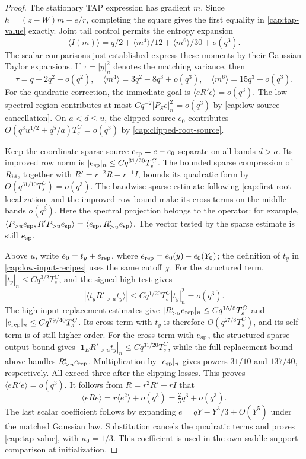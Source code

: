 \begin{proof}
The stationary TAP expression has gradient $m$. Since $h=(z-W)m-e/r$,
completing the square gives the first equality in \eqref{cap:tap-value}
exactly. Joint tail control permits the entropy expansion
\[
 \langle I(m)\rangle
 =q/2+\langle m^4\rangle/12+\langle m^6\rangle/30+o(q^3).
\]
The scalar comparisons just established express these moments by their
Gaussian Taylor expansions.  If $\tau=|y|_n^2$ denotes the matching
variance, then
\[
 \tau=q+2q^2+o(q^2),\quad
 \langle m^4\rangle=3q^2-8q^3+o(q^3),\quad
 \langle m^6\rangle=15q^3+o(q^3).
\]
For the quadratic correction, the immediate goal is
\(\langle eR'e\rangle=o(q^3)\). The low spectral region contributes at
most \(Cq^{-2}|P_Se|_n^2=o(q^3)\) by
\eqref{cap:low-source-cancellation}. On \(a<d\le u\), the clipped source
\(e_0\) contributes \(O(q^3u^{1/2}+q^5/a)T_s^C=o(q^3)\) by
\eqref{cap:clipped-root-source}.

Keep the coordinate-sparse source \(e_{\rm sp}=e-e_0\) separate on all
bands \(d>a\). Its improved row norm is
\(|e_{\rm sp}|_n\le Cq^{31/20}T_s^C\). The bounded sparse compression of
\(R_{\rm hi}\), together with \(R'=r^{-2}R-r^{-1}I\), bounds its
quadratic form by \(O(q^{31/10}T_s^C)=o(q^3)\). The bandwise sparse estimate
following \eqref{cap:first-root-localization} and the improved row bound
make its cross terms on the middle bands \(o(q^3)\). Here the spectral projection
belongs to the operator: for example,
\(\langle P_{>u}e_{\rm sp},R'P_{>u}e_{\rm sp}\rangle
=\langle e_{\rm sp},R'_{>u}e_{\rm sp}\rangle\). The vector tested by the
sparse estimate is still \(e_{\rm sp}\).

Above \(u\), write \(e_0=t_y+e_{\rm rep}\), where
\(e_{\rm rep}=e_0(y)-e_0(Y_0)\); the definition of \(t_y\) in
\eqref{cap:low-input-recipes} uses the same cutoff \(\chi\).
For the structured term,
\(|t_y|_n\le Cq^{3/2}T_s^C\), and the signed high test gives
\[
 |\langle t_yR'_{>u}t_y\rangle|
 \le Cq^{1/20}T_s^C|t_y|_n^2=o(q^3).
\]
The high-input replacement estimates give
\(|R'_{>u}e_{\rm rep}|_n\le Cq^{15/8}T_s^C\) and
\(|e_{\rm rep}|_n\le Cq^{79/40}T_s^C\). Its cross term with \(t_y\)
is therefore \(O(q^{27/8}T_s^C)\), and its self term is of still higher
order. For the cross term with \(e_{\rm sp}\), the structured sparse-output
bound gives
\(|\mathbf1_E R'_{>u}t_y|_n\le Cq^{31/20}T_s^C\), while the full
replacement bound above handles \(R'_{>u}e_{\rm rep}\). Multiplication by
\(|e_{\rm sp}|_n\) gives powers \(31/10\) and \(137/40\), respectively.
All exceed three after the clipping losses. This proves
\(\langle eR'e\rangle=o(q^3)\). It follows from \(R=r^2R'+rI\) that
\[
 \langle eRe\rangle=r\langle e^2\rangle+o(q^3)
                         =\tfrac23q^3+o(q^3).
\]
The last scalar coefficient follows by expanding $e=qY-Y^3/3+O(Y^5)$ under the
matched Gaussian law. Substitution cancels the quadratic terms and proves
\eqref{cap:tap-value}, with $\kappa_0=1/3$. This coefficient is used in
the own-saddle support comparison at initialization.


\end{proof}
